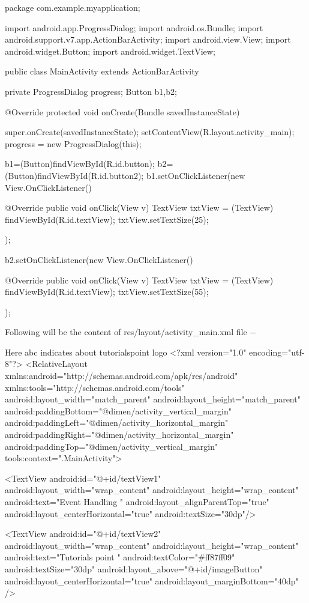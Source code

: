 \documentclass{fisatproject}
\begin{document}
package com.example.myapplication;

import android.app.ProgressDialog;
import android.os.Bundle;
import android.support.v7.app.ActionBarActivity;
import android.view.View;
import android.widget.Button;
import android.widget.TextView;

public class MainActivity extends ActionBarActivity {
   private ProgressDialog progress;
   Button b1,b2;

   @Override
   protected void onCreate(Bundle savedInstanceState) {
      super.onCreate(savedInstanceState);
      setContentView(R.layout.activity_main);
      progress = new ProgressDialog(this);

      b1=(Button)findViewById(R.id.button);
      b2=(Button)findViewById(R.id.button2);
      b1.setOnClickListener(new View.OnClickListener() {
         
         @Override
         public void onClick(View v) {
            TextView txtView = (TextView) findViewById(R.id.textView);
            txtView.setTextSize(25);
         }
      });

      b2.setOnClickListener(new View.OnClickListener() {
         
         @Override
         public void onClick(View v) {
            TextView txtView = (TextView) findViewById(R.id.textView);
            txtView.setTextSize(55);
         }
      });
   }
}
Following will be the content of res/layout/activity_main.xml file −

Here abc indicates about tutorialspoint logo
<?xml version="1.0" encoding="utf-8"?>
<RelativeLayout 
   xmlns:android="http://schemas.android.com/apk/res/android"
   xmlns:tools="http://schemas.android.com/tools"
   android:layout_width="match_parent"
   android:layout_height="match_parent"
   android:paddingBottom="@dimen/activity_vertical_margin"
   android:paddingLeft="@dimen/activity_horizontal_margin"
   android:paddingRight="@dimen/activity_horizontal_margin"
   android:paddingTop="@dimen/activity_vertical_margin"
   tools:context=".MainActivity">
   
   <TextView
      android:id="@+id/textView1"
      android:layout_width="wrap_content"
      android:layout_height="wrap_content"
      android:text="Event Handling "
      android:layout_alignParentTop="true"
      android:layout_centerHorizontal="true"
      android:textSize="30dp"/>
      
   <TextView
      android:id="@+id/textView2"
      android:layout_width="wrap_content"
      android:layout_height="wrap_content"
      android:text="Tutorials point "
      android:textColor="#ff87ff09"
      android:textSize="30dp"
      android:layout_above="@+id/imageButton"
      android:layout_centerHorizontal="true"
      android:layout_marginBottom="40dp" />
      
\end{document}
